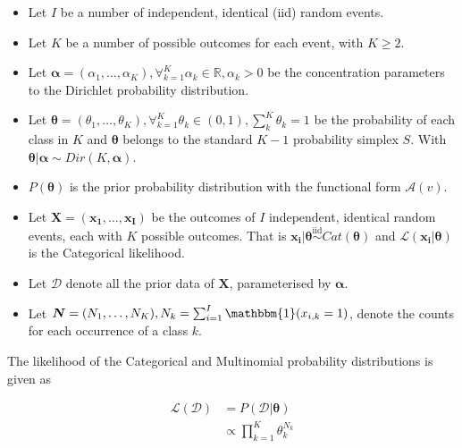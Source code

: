 \begin{itemize}
      \item Let $I$ be a number of independent, identical (iid) random events.

      \item Let $K$ be a number of possible outcomes for each event, with $K \geq 2$.

      \item Let $\boldsymbol{\alpha} = (\alpha_{1}, \dots, \alpha_{K}), \forall_{k=1}^{K} \alpha_{k} \in \mathbb{R}, \alpha_{k} > 0$ be the concentration parameters to the Dirichlet probability distribution.

      \item Let $\boldsymbol{\theta} = (\theta_{1}, \dots, \theta_{K}), \forall_{k=1}^{K} \theta_{k} \in (0,1), \sum_{k}^{K} \theta_{k} = 1$ be the probability of each class in $K$ and $\boldsymbol{\theta}$ belongs to the standard $K-1$ probability simplex $S$. With $\boldsymbol{\theta} | \boldsymbol{\alpha} \sim Dir(K, \boldsymbol{\alpha})$.

      \item $P(\boldsymbol{\theta})$ is the prior probability distribution with the functional form $\mathcal{A}(v)$.

      \item Let $\boldsymbol{X} = (\boldsymbol{x_{1}}, \dots, \boldsymbol{x_{I}})$ be the outcomes of $I$ independent, identical random events, each with $K$ possible outcomes. That is $\boldsymbol{x_{i}} | \boldsymbol{\theta} \overset{\text{iid}}{\sim} Cat(\boldsymbol{\theta})$ and $\mathcal{L}(\boldsymbol{x_{i}} \vert \boldsymbol{\theta})$ is the Categorical likelihood.

      \item Let $\boldsymbol{\mathcal{D}}$ denote all the prior data of $\boldsymbol{X}$, parameterised by $\boldsymbol{\alpha}$.

      \item Let $\boldsymbol{N} = (N_{1}, \dots, N_{K}), N_{k} = \sum_{i=1}^{I} \mathbbm{1}(x_{i,k} = 1)$, denote the counts for each occurrence of a class $k$.
\end{itemize}

The likelihood of the Categorical and Multinomial probability distributions is given as

\begin{equation}
      \label{eq:probability:conjugate_priors:mult_likelihood:likelihood}
      \begin{split}
            \mathcal{L}(\boldsymbol{\mathcal{D}}) &=  P(\boldsymbol{\mathcal{D}} | \boldsymbol{\theta}) \\
            &\propto \prod_{k=1}^{K} \theta_{k}^{N_{k}}
      \end{split}
\end{equation}

